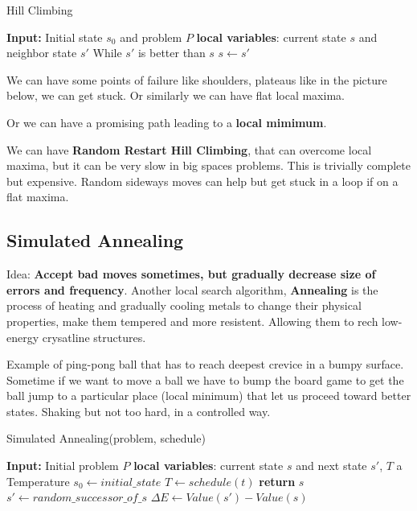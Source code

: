 \documentclass[12pt]{book}
\begin{document}
\begin{algorithm}
\caption{Hill Climbing}
\State \textbf{Input:} Initial state $s_0$ and problem $P$\newline
\State \textbf{local variables}: current state $s$ and neighbor state $s'$\newline
\State While $s'$ is better than $s$
\State $s \gets s'$
\end{algorithm}

We can have some points of failure like shoulders, plateaus like in the picture below, we can get stuck.
Or similarly we can have flat local maxima.


Or we can have a promising path leading to a \textbf{local mimimum}.


We can have \textbf{Random Restart Hill Climbing}, that can overcome local maxima, but it can be very slow in big spaces problems. This is trivially complete but expensive.
Random sideways moves can help but get stuck in a loop if on a flat maxima.


\subsection{Simulated Annealing}
Idea: \textbf{Accept bad moves sometimes, but gradually decrease size of errors and frequency}.\newline
Another local search algorithm, \textbf{Annealing} is the process of heating and gradually cooling metals to change their physical properties, make them tempered and more resistent.
Allowing them to rech low-energy crysatline structures.

Example of ping-pong ball that has to reach deepest crevice in a bumpy surface.
Sometime if we want to move a ball we have to bump the board game to get the ball jump to a particular place (local minimum) that let us proceed toward better states. Shaking but not too hard, in a controlled way.

\begin{algorithm}[H]
\caption{Simulated Annealing(problem, schedule)}
\begin{algorithmic}[1]
\STATE \textbf{Input:} Initial problem $P$
\STATE \textbf{local variables}: current state $s$ and next state $s'$, $T$ a Temperature
\STATE $s_0 \gets initial\_state$
\STATE $T \gets schedule(t)$
\STATE \textbf{return} $s$
\STATE $s' \gets random\_successor\_of\_s$
\STATE $\Delta E \gets Value(s') - Value(s)$
\ENDIF
{} 
  
\ENDIF
\ENDFOR
\end{algorithmic}
\end{algorithm}
\end{document}
